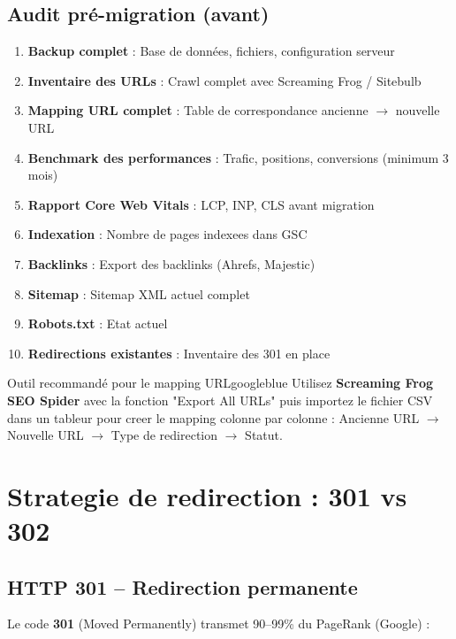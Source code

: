 \documentclass[12pt,a4paper,twoside]{report}
\newcommand{\keyword}[1]{\textbf{\textcolor{googleblue}{#1}}}
\newcommand{\important}[1]{\textbf{\textcolor{googlered}{#1}}}
\begin{document}
\subsection{Audit pré-migration (\important{avant})}

\begin{enumerate}
    \item \textbf{Backup complet} : Base de données, fichiers, configuration serveur
    \item \textbf{Inventaire des URLs} : Crawl complet avec Screaming Frog / Sitebulb
    \item \textbf{Mapping URL complet} : Table de correspondance ancienne $\rightarrow$ nouvelle URL
    \item \textbf{Benchmark des performances} : Trafic, positions, conversions (minimum 3 mois)
    \item \textbf{Rapport Core Web Vitals} : LCP, INP, CLS avant migration
    \item \textbf{Indexation} : Nombre de pages indexees dans GSC
    \item \textbf{Backlinks} : Export des backlinks (Ahrefs, Majestic)
    \item \textbf{Sitemap} : Sitemap XML actuel complet
    \item \textbf{Robots.txt} : Etat actuel
    \item \textbf{Redirections existantes} : Inventaire des 301 en place
\end{enumerate}

\begin{mybox}{Outil recommandé pour le mapping URL}{googleblue}
Utilisez \textbf{Screaming Frog SEO Spider} avec la fonction "Export All URLs" puis importez le fichier CSV dans un tableur pour creer le mapping colonne par colonne : Ancienne URL $\rightarrow$ Nouvelle URL $\rightarrow$ Type de redirection $\rightarrow$ Statut.
\end{mybox}

\section{Strategie de redirection : 301 vs 302}

\subsection{HTTP 301 -- Redirection permanente}

Le code \keyword{301} (Moved Permanently) transmet 90--99\% du PageRank (Google) :
\end{document}
